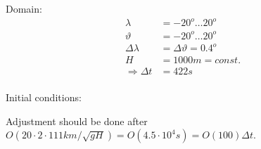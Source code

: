 \documentclass[a4paper]{article}
\begin{document}
Domain:
\begin{equation}
  \begin{split}
    \lambda & = -20^o \ldots 20^o \\
    \vartheta & = -20^o \ldots 20^o \\
    \Delta \lambda & = \Delta \vartheta = 0.4^o \\
    H & = 1000m = const. \\
    \Rightarrow \Delta t & = 422 s \\
  \end{split}
\end{equation}

Initial conditions:

Adjustment should be done after $O(20 \cdot 2 \cdot 111km / \sqrt{gH}) = 
O(4.5\cdot 10^4s) = O(100) \Delta t$.


%
%
\end{document}
